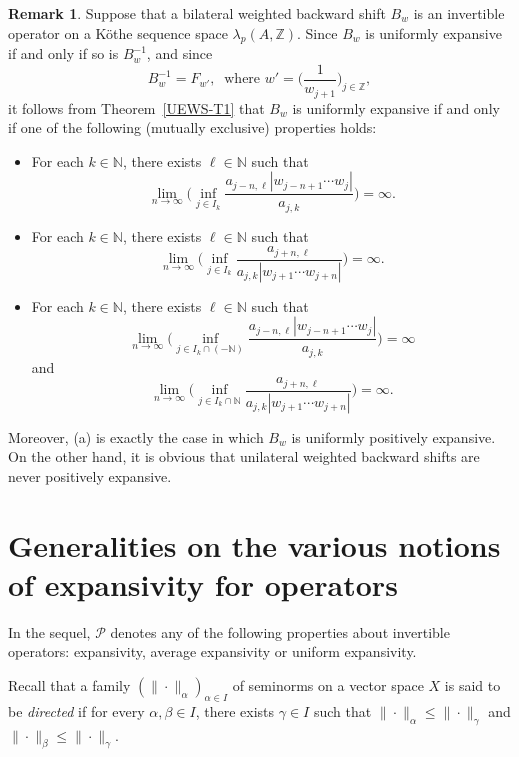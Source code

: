\documentclass[12pt]{amsart}
\theoremstyle{theorem}
\theoremstyle{definition}
\newtheorem{remark}[theorem]{Remark}
\theoremstyle{remark} \theoremstyle{question} \theoremstyle{example}
\newcommand{\N}{\mathbb{N}}   %
\newcommand{\Z}{\mathbb{Z}}   %
\newcommand{\cP}{\mathcal{P}}
\begin{document}
\begin{remark}\label{UEWS-R3}
Suppose that a bilateral weighted backward shift $B_w$ is an invertible operator on a K\"othe sequence space $\lambda_p(A,\Z)$.
Since $B_w$ is uniformly expansive if and only if so is $B_w^{-1}$, and since 
\[
B_w^{-1} = F_{w'}, \ \text{ where } w' = \Big(\frac{1}{w_{j+1}}\Big)_{j \in \Z},
\]
it follows from Theorem~\ref{UEWS-T1} that $B_w$ is uniformly expansive if and only if 
one of the following (mutually exclusive) properties holds:
\begin{itemize}
\item [\rm (a)] For each $k \in \N$, there exists $\ell \in \N$ such that
    \[
    \lim_{n \to \infty} \Big(\inf_{j \in I_k} \frac{a_{j-n,\ell} |w_{j-n+1} \cdots w_j|}{a_{j,k}}\Big) = \infty.
    \]
\item [\rm (b)] For each $k \in \N$, there exists $\ell \in \N$ such that
    \[
    \lim_{n \to \infty} \Big(\inf_{j \in I_k} \frac{a_{j+n,\ell}}{a_{j,k} |w_{j+1} \cdots w_{j+n}|}\Big) = \infty.
    \]
\item [\rm (c)] For each $k \in \N$, there exists $\ell \in \N$ such that
    \[
    \lim_{n \to \infty} \Big(\inf_{j \in I_k \cap (-\N)} \frac{a_{j-n,\ell} |w_{j-n+1} \cdots w_j|}{a_{j,k}}\Big) = \infty
    \]
    and
    \[
    \lim_{n \to \infty} \Big(\inf_{j \in I_k \cap \N} \frac{a_{j+n,\ell}}{a_{j,k} |w_{j+1} \cdots w_{j+n}|}\Big) = \infty.
    \]
\end{itemize}
Moreover, (a) is exactly the case in which $B_w$ is uniformly positively expansive.
On the other hand, it is obvious that unilateral weighted backward shifts are never positively expansive.
\end{remark}


\section{Generalities on the various notions of expansivity for operators}\label{S-Gen}

In the sequel, $\cP$ denotes any of the following properties about invertible operators:
expansivity, average expansivity or uniform expansivity.

Recall that a family $(\|\cdot\|_\alpha)_{\alpha \in I}$ of seminorms on a vector space $X$ is said to be {\em directed} if
for every $\alpha,\beta \in I$, there exists $\gamma \in I$ such that
$\|\cdot\|_\alpha \leq \|\cdot\|_\gamma$ and $\|\cdot\|_\beta \leq \|\cdot\|_\gamma$.
\end{document}
